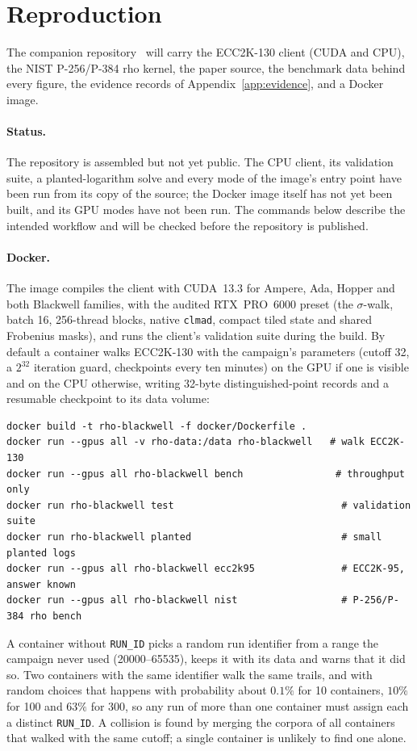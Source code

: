 \appendix
\section{Reproduction}
\label{app:repro}

The companion repository~\cite{rhoblackwell} will carry the ECC2K-130
client (CUDA and CPU), the NIST P-256/P-384 rho kernel, the paper source,
the benchmark data behind every figure, the evidence records of
Appendix~\ref{app:evidence}, and a Docker image.

\paragraph{Status.} The repository is assembled but not yet public. The
CPU client, its validation suite, a planted-logarithm solve and every
mode of the image's entry point have been run from its copy of the
source; the Docker image itself has not yet been built, and its GPU modes
have not been run. The commands below describe the intended workflow and
will be checked before the repository is published.

\paragraph{Docker.} The image compiles the client with CUDA~13.3 for
Ampere, Ada, Hopper and both Blackwell families, with the audited
RTX~PRO~6000 preset (the $\sigma$-walk, batch 16, 256-thread blocks,
native \texttt{clmad}, compact tiled state and shared Frobenius masks),
and runs the client's validation suite during the build. By default a
container walks ECC2K-130 with the campaign's parameters (cutoff 32, a
$2^{32}$ iteration guard, checkpoints every ten minutes) on the GPU if one
is visible and on the CPU otherwise, writing 32-byte distinguished-point
records and a resumable checkpoint to its data volume:
{\small\begin{verbatim}
docker build -t rho-blackwell -f docker/Dockerfile .
docker run --gpus all -v rho-data:/data rho-blackwell   # walk ECC2K-130
docker run --gpus all rho-blackwell bench                # throughput only
docker run rho-blackwell test                             # validation suite
docker run rho-blackwell planted                          # small planted logs
docker run --gpus all rho-blackwell ecc2k95               # ECC2K-95, answer known
docker run --gpus all rho-blackwell nist                  # P-256/P-384 rho bench
\end{verbatim}}
A container without \texttt{RUN\_ID} picks a random run identifier from
a range the campaign never used (20000--65535), keeps it with its data
and warns that it did so. Two containers with the same identifier walk
the same trails, and with random choices that happens with probability
about $0.1\%$ for 10 containers, $10\%$ for 100 and $63\%$ for 300, so any
run of more than one container must assign each a distinct
\texttt{RUN\_ID}. A collision is
found by merging the corpora of all containers that walked with the
same cutoff; a single container is unlikely to find one alone.


